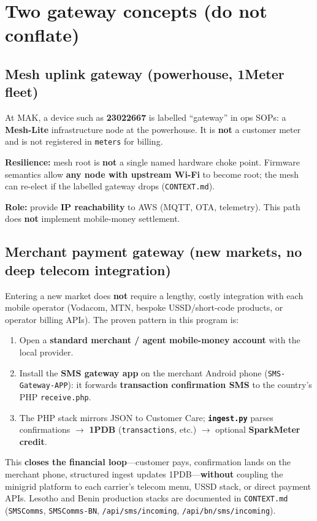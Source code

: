 \documentclass[11pt,a4paper]{article}
\begin{document}
\section{Two gateway concepts (do not conflate)}

\subsection{Mesh uplink gateway (powerhouse, 1Meter fleet)}

At MAK, a device such as \textbf{23022667} is labelled ``gateway'' in ops SOPs: a \textbf{Mesh-Lite} infrastructure node at the powerhouse. It is \textbf{not} a customer meter and is not registered in \texttt{meters} for billing.

\textbf{Resilience:} mesh root is \textbf{not} a single named hardware choke point. Firmware semantics allow \textbf{any node with upstream Wi-Fi} to become root; the mesh can re-elect if the labelled gateway drops (\texttt{CONTEXT.md}).

\textbf{Role:} provide \textbf{IP reachability} to AWS (MQTT, OTA, telemetry). This path does \textbf{not} implement mobile-money settlement.

\subsection{Merchant payment gateway (new markets, no deep telecom integration)}

Entering a new market does \textbf{not} require a lengthy, costly integration with each mobile operator (Vodacom, MTN, bespoke USSD/short-code products, or operator billing APIs). The proven pattern in this program is:

\begin{enumerate}[nosep]
  \item Open a \textbf{standard merchant / agent mobile-money account} with the local provider.
  \item Install the \textbf{SMS gateway app} on the merchant Android phone (\texttt{SMS-Gateway-APP}): it forwards \textbf{transaction confirmation SMS} to the country's PHP \texttt{receive.php}.
  \item The PHP stack mirrors JSON to Customer Care; \textbf{\texttt{ingest.py}} parses confirmations $\rightarrow$ \textbf{1PDB} (\texttt{transactions}, etc.) $\rightarrow$ optional \textbf{SparkMeter credit}.
\end{enumerate}

This \textbf{closes the financial loop}---customer pays, confirmation lands on the merchant phone, structured ingest updates 1PDB---\textbf{without} coupling the minigrid platform to each carrier's telecom menu, USSD stack, or direct payment APIs. Lesotho and Benin production stacks are documented in \texttt{CONTEXT.md} (\texttt{SMSComms}, \texttt{SMSComms-BN}, \texttt{/api/sms/incoming}, \texttt{/api/bn/sms/incoming}).
\end{document}
